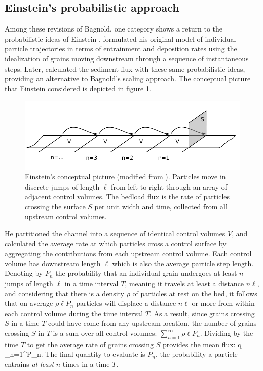 \subsection{Einstein's probabilistic approach}
\label{sec:einflux}

Among these revisions of Bagnold, one category shows a return to the probabilistic ideas of Einstein \citep{Parker2003,Ancey2006}.
\citet{Einstein1937} formulated his original model of individual particle trajectories in terms of entrainment and deposition rates using the idealization of grains moving downstream through a sequence of instantaneous steps.
Later, \citet{Einstein1942,Einstein1950} calculated the sediment flux with these same probabilistic ideas, providing an alternative to Bagnold's scaling approach.
The conceptual picture that Einstein considered is depicted in figure \ref{fig:einsteinFluxConcept}.
 \begin{figure}[!htbp]
	\includegraphics[width=\linewidth,keepaspectratio]{./figures/ch1/yalinDrawing.pdf}
	\caption{Einstein’s conceptual picture (modified from \citet{Yalin1972}). Particles move in discrete jumps of length $\ell$ from
left to right through an array of adjacent control volumes. The bedload flux is the rate of particles crossing
the surface $S$ per unit width and time, collected from all upstream control volumes.}
	\label{fig:einsteinFluxConcept}
\end{figure}

He partitioned the channel into a sequence of identical control volumes $V$, and calculated the average rate at which particles cross a control surface by aggregating the contributions from each upstream control volume.
Each control volume has downstream length $\ell$ which is also the average particle step length.
Denoting by $P_n$ the probability that an individual grain undergoes at least $n$ jumps of length $\ell$ in a time interval $T$, meaning it travels at least a distance $n \ell$, and considering that there is a density $\rho$ of particles at rest on the bed, it follows that on average $\rho \ell P_n$ particles will displace a distance $n \ell$ or more from within each control volume during the time interval $T$. 
As a result, since grains crossing $S$ in a time $T$ could have come from any upstream location, the number of grains crossing $S$ in $T$ is a sum over all control volumes: $\sum_{n=1}^\infty \rho \ell P_n$.
Dividing by the time $T$ to get the average rate of grains crossing $S$ provides the mean flux:
\be q =  \sum_{n=1}^\infty P_n. \label{eq:einflux} \ee
The final quantity to evaluate is $P_n$, the probability a particle entrains \textit{at least} $n$ times in a time $T$.

